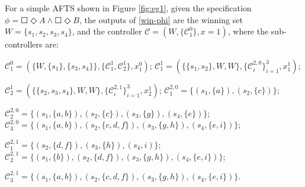 \begin{example}
	\label{ex:exec}
	For a simple AFTS shown in Figure \ref{fig:eg1}, given the specification $ \phi = \Square \Diamond A \wedge \Square \Diamond B $, the outputs of \eqref{win-phi} are the winning set $ W= \{s_1,s_2,s_3,s_4\}$, and the controller $ \mathcal{C} = (W,\{\mathcal{C}^0_1\}, x = 1) $, where the sub-controllers are:
	
	\noindent$ \mathcal{C}^0_1 = (\{W,\{s_1\},\{s_3,s_4\}\},\{\mathcal{C}^1_1, \mathcal{C}^1_2\}, x^0_1 ) $; 
	$ \mathcal{C}^1_1 = (\{\{s_1,s_2\},W,W \},\{\mathcal{C}^{2,0}_i\}_{i=1}^3,x^1_1)$; 
	
	\noindent$ \mathcal{C}^1_2 = (\{\{s_2,s_3,s_4\},W,W \},\{\mathcal{C}^{2,1}_i\}_{i=1}^{3},x^1_2 )$; $ \mathcal{C}^{2,0}_1 = \{(s_1,\{a\}),(s_2,\{c\})\} $; 
	
	\noindent$ \mathcal{C}^{2,0}_2 = \{(s_1,\{a,b\}),(s_2,\{c\}),(s_3,\{g\}),(s_4,\{e\})\} $;
	$ \mathcal{C}^{2,0}_3 = \{(s_1,\{a,b\}),(s_2,\{c,d,f\}),(s_3,\{g,h\}),(s_4,\{e,i\})\} $; 
	
	\noindent$ \mathcal{C}^{2,1}_1 = \{(s_2,\{d,f\}),(s_3,\{h\}),(s_4,i)\} $; $ \mathcal{C}^{2,1}_2 = \{(s_1,\{b\}),(s_2,\{d,f\}), (s_3,\{g,h\}), (s_4,\{e,i\})\} $;
	
	\noindent$ \mathcal{C}^{2,1}_3 = \{(s_1,\{a,b\}),(s_2,\{c,d,f\}),(s_3,\{g,h\}),(s_4,\{e,i\})\} $.
	

\end{example}
